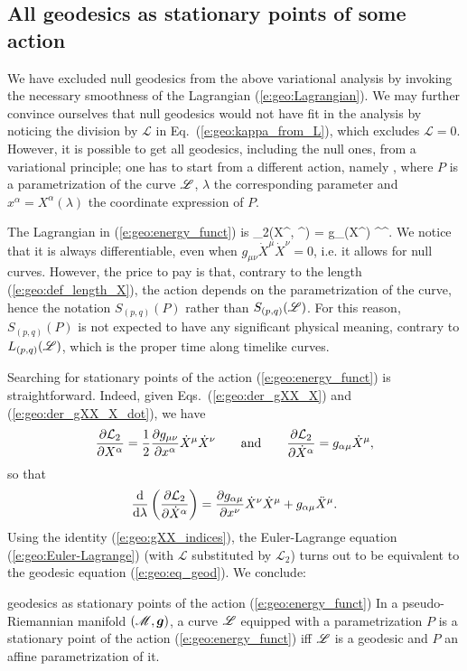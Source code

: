 \subsection{All geodesics as stationary points of some action} \label{s:geo:all_geod}

We have excluded null geodesics from the above variational analysis by
invoking the necessary smoothness of the Lagrangian (\ref{e:geo:Lagrangian}).
We may further convince ourselves that null geodesics would not have fit
in the analysis by noticing the division by $\mathcal{L}$ in Eq.~(\ref{e:geo:kappa_from_L}),
which excludes $\mathcal{L} = 0$.
However, it is possible to get all geodesics, including the null ones, from
a variational principle; one has to start from a different action, namely
\be \label{e:geo:energy_funct}
    ,
\ee
where $P$ is a parametrization of the curve $\mathscr{L}$, $\lambda$
the corresponding parameter
and $x^\alpha = X^\alpha(\lambda)$ the coordinate expression of $P$.

The Lagrangian in (\ref{e:geo:energy_funct}) is
\be \label{e:geo:Lagrangian2}
   _2(X^\alpha, ^\alpha) =  
        g_{\mu\nu}(X^\rho) ^\mu {}^\nu  .
\ee
We notice that it is always differentiable, even
when $g_{\mu\nu}\dot{X}^\mu \dot{X}^\nu  = 0$, i.e. it allows for null curves.
However, the price to pay is that,
contrary to the length (\ref{e:geo:def_length_X}),
the action depends on the parametrization of the curve,
hence the notation $S_{(p,q)}(P)$ rather than $S_{(p,q)}(\mathscr{L})$.
For this reason, $S_{(p,q)}(P)$ is not expected to have any significant
physical meaning, contrary to $L_{(p,q)}(\mathscr{L})$, which is the proper
time along timelike curves.

Searching for stationary points of the action
(\ref{e:geo:energy_funct}) is straightforward. Indeed,
given Eqs.~(\ref{e:geo:der_gXX_X}) and (\ref{e:geo:der_gXX_X_dot}),
we have
\[
    \frac{\partial \mathcal{L}_2}{\partial X^\alpha} = \frac{1}{2}
        \frac{\partial g_{\mu\nu}}{\partial x^\alpha}  \dot{X}^\mu \dot{X}^\nu
    \qquad\mbox{and}\qquad
    \frac{\partial \mathcal{L}_2}{\partial \dot{X}^\alpha} = g_{\alpha\mu} \dot{X}^\mu ,
\]
so that
\[
    \frac{\mathrm{d}}{\mathrm{d}\lambda}\left( \frac{\partial \mathcal{L}_2}{\partial \dot{X}^\alpha}\right) =
      \frac{\partial g_{\alpha\mu}}{\partial x^\nu} \dot{X}^\nu \dot{X}^\mu
      + g_{\alpha\mu} \ddot{X}^\mu .
\]
Using the identity (\ref{e:geo:gXX_indices}), the Euler-Lagrange equation
(\ref{e:geo:Euler-Lagrange}) (with $\mathcal{L}$ substituted by $\mathcal{L}_2$)
turns out to be equivalent to the geodesic equation (\ref{e:geo:eq_geod}).
We conclude:
\begin{tprop}{geodesics as stationary points of the action (\ref{e:geo:energy_funct})}{}
In a pseudo-Riemannian manifold $(\mathscr{M},\bm{g})$, a
curve $\mathscr{L}$ equipped with a parametrization $P$
is a stationary point of the action (\ref{e:geo:energy_funct})
iff $\mathscr{L}$ is a geodesic and $P$ an affine parametrization of it.
\end{tprop}

